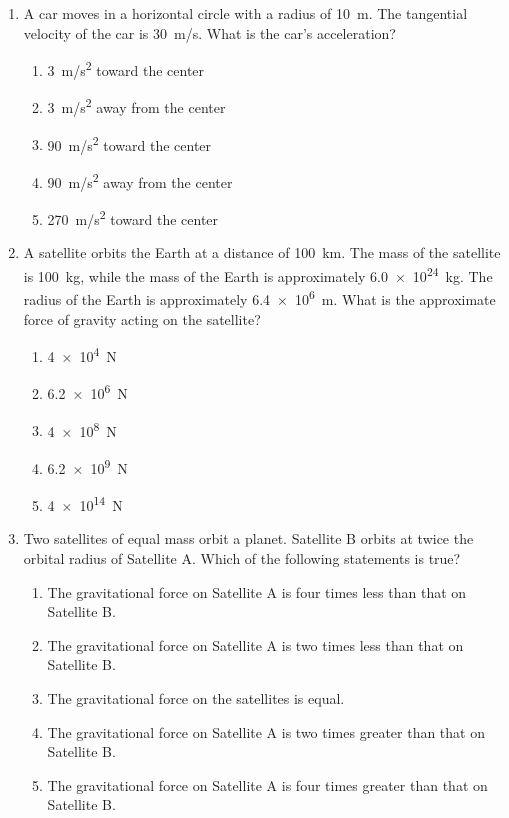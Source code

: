 \documentclass{../../oss-apphys}
\begin{document}
\genheader


\genmultidirections

\gengravity

\raggedcolumns
\begin{multicols}{2}

  \begin{enumerate}[leftmargin=18pt]

  \item A car moves in a horizontal circle with a radius of \SI{10}{m}. The
    tangential velocity of the car is \SI{30}{m/s}. What is the car's
    acceleration?
    \begin{enumerate}[noitemsep,topsep=0pt,leftmargin=18pt]
    \item\SI{3}{m/s^2} toward the center
    \item\SI{3}{m/s^2} away from the center
    \item\SI{90}{m/s^2} toward the center
    \item\SI{90}{m/s^2} away from the center
    \item\SI{270}{m/s^2} toward the center
    \end{enumerate}
  
  \item A satellite orbits the Earth at a distance of \SI{100}{km}. The mass of
    the satellite is \SI{100}{kg}, while the mass of the Earth is approximately
    \SI{6.0e24}{kg}. The radius of the Earth is approximately \SI{6.4e6}{m}.
    What is the approximate force of gravity acting on the satellite?
    \begin{enumerate}[noitemsep,topsep=0pt,leftmargin=18pt]
    \item\SI{4e4}{N}
    \item\SI{6.2e6}{N}
    \item\SI{4e8}{N}
    \item\SI{6.2e9}{N}
    \item\SI{4e14}{N}
    \end{enumerate}

  \item Two satellites of equal mass orbit a planet. Satellite B orbits at twice
    the orbital radius of Satellite A. Which of the following statements is
    true?
    \begin{enumerate}[noitemsep,topsep=0pt,leftmargin=18pt]
    \item The gravitational force on Satellite A is four times less than that on
      Satellite B.
    \item The gravitational force on Satellite A is two times less than that on
      Satellite B.
    \item The gravitational force on the satellites is equal.
    \item The gravitational force on Satellite A is two times greater than that
      on Satellite B.
    \item The gravitational force on Satellite A is four times greater than that
      on Satellite B.
    \end{enumerate}


\end{enumerate}
\end{multicols}
\end{document}
